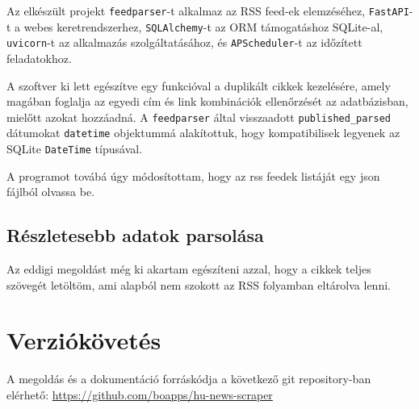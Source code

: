 \documentclass[]{article}
\begin{document}
Az elkészült projekt \texttt{feedparser}-t alkalmaz az RSS feed-ek elemzéséhez, \texttt{FastAPI}-t a webes keretrendszerhez, \texttt{SQLAlchemy}-t az ORM támogatáshoz SQLite-al, \texttt{uvicorn}-t az alkalmazás szolgáltatásához, és \texttt{APScheduler}-t az időzített feladatokhoz.

A szoftver ki lett egészítve egy funkcióval a duplikált cikkek kezelésére, amely magában foglalja az egyedi cím és link kombinációk ellenőrzését az adatbázisban, mielőtt azokat hozzáadná. A \texttt{feedparser} által visszaadott \texttt{published\_parsed} dátumokat \texttt{datetime} objektummá alakítottuk, hogy kompatibilisek legyenek az SQLite \texttt{DateTime} típusával.

A programot továbá úgy módosítottam, hogy az rss feedek listáját egy json fájlból olvassa be.

\subsection{Részletesebb adatok parsolása}

Az eddigi megoldást még ki akartam egészíteni azzal, hogy a cikkek teljes szövegét letöltöm, ami alapból nem szokott az RSS folyamban eltárolva lenni.

\section{Verziókövetés}

A megoldás és a dokumentáció forráskódja a következő git repository-ban elérhető: \url{https://github.com/boapps/hu-news-scraper}
\end{document}

